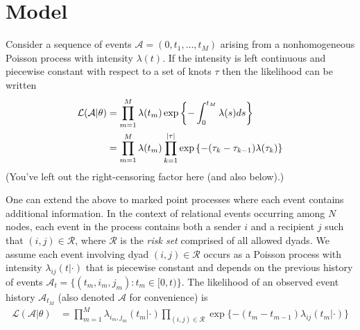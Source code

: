\section{Model}

Consider a sequence of events $\mathcal{A} = (0,t_1, \ldots, t_M)$ arising from a nonhomogeneous Poisson process with  intensity $\lambda(t)$.
If the intensity is left continuous and piecewise constant with respect to a set of knots $\tau$ then the likelihood can be written
\begin{align}
\mathcal{L}(\mathcal{A}|\theta) &= \prod_{m=1}^M \lambda(t_m) \exp\left\{ - \int_{0}^{t_M} \lambda(s)ds \right\} \notag  \\
&= \prod_{m=1}^M \lambda(t_m) \prod_{k=1}^{|\tau|} \exp\left\{ - (\tau_{k} - \tau_{k-1}) \lambda(\tau_k) \right\}%
\end{align}
{\color{red} (You've left out the right-censoring factor here (and also below).)}

One can extend the above to marked point processes where each event contains additional information.
In the context of relational events occurring among $N$ nodes, each event in the process contains both a sender $i$ and a recipient $j$ such that  $(i,j) \in \mathcal{R}$, where $\mathcal{R}$ is the \emph{risk set} comprised of all allowed dyads.
We assume each event involving dyad $(i,j) \in \mathcal{R}$ occurs as a Poisson process with intensity $\lambda_{ij}(t|\cdot)$ that is piecewise constant and depends on the previous history of events  $\mathcal{A}_t = \{(t_m,i_m,j_m): t_m \in [0,t) \}$.
The likelihood of an observed event history $\mathcal{A}_{t_M}$ (also denoted $\mathcal{A}$ for convenience) is
\begin{align}
\mathcal{L}(\mathcal{A}|\theta) &= \prod_{m=1}^M \lambda_{i_m,j_m}(t_m|\cdot) \prod_{(i,j) \in \mathcal{R}}\exp\{ - (t_m - t_{m-1}) \lambda_{ij}(t_m | \cdot) \}
\label{eqn:llk}
\end{align}

